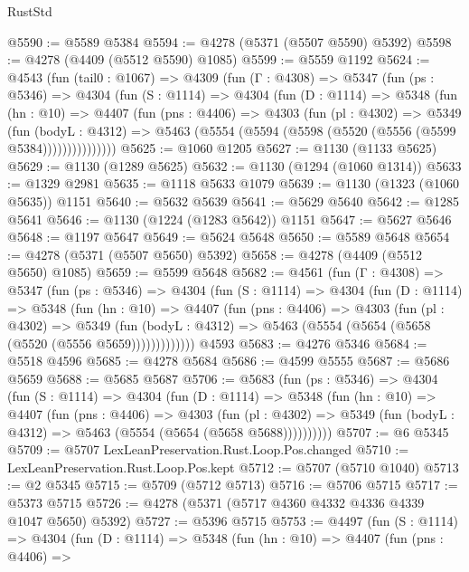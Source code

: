 \begin{lexlean}{RustStd}
\begin{coremodule}
@5590 := @5589 @5384
@5594 := @4278 (@5371 (@5507 @5590) @5392)
@5598 := @4278 (@4409 (@5512 @5590) @1085)
@5599 := @5559 @1192
@5624 := @4543
    (fun (tail0 : @1067) =>
    @4309
      (fun (Γ : @4308) =>
      @5347
        (fun (ps : @5346) =>
        @4304
          (fun (S : @1114) =>
          @4304
            (fun (D : @1114) =>
            @5348
              (fun (hn : @10) =>
              @4407
                (fun (pns : @4406) =>
                @4303
                  (fun (pl : @4302) =>
                  @5349
                    (fun (bodyL : @4312) =>
                    @5463 (@5554 (@5594 (@5598 (@5520 (@5556 (@5599 @5384)))))))))))))))
@5625 := @1060 @1205
@5627 := @1130 (@1133 @5625)
@5629 := @1130 (@1289 @5625)
@5632 := @1130 (@1294 (@1060 @1314))
@5633 := @1329 @2981
@5635 := @1118 @5633 @1079
@5639 := @1130 (@1323 (@1060 @5635)) @1151
@5640 := @5632 @5639
@5641 := @5629 @5640
@5642 := @1285 @5641
@5646 := @1130 (@1224 (@1283 @5642)) @1151
@5647 := @5627 @5646
@5648 := @1197 @5647
@5649 := @5624 @5648
@5650 := @5589 @5648
@5654 := @4278 (@5371 (@5507 @5650) @5392)
@5658 := @4278 (@4409 (@5512 @5650) @1085)
@5659 := @5599 @5648
@5682 := @4561
    (fun (Γ : @4308) =>
    @5347
      (fun (ps : @5346) =>
      @4304
        (fun (S : @1114) =>
        @4304
          (fun (D : @1114) =>
          @5348
            (fun (hn : @10) =>
            @4407
              (fun (pns : @4406) =>
              @4303
                (fun (pl : @4302) =>
                @5349
                  (fun (bodyL : @4312) =>
                  @5463 (@5554 (@5654 (@5658 (@5520 (@5556 @5659)))))))))))))
    @4593
@5683 := @4276 @5346
@5684 := @5518 @4596
@5685 := @4278 @5684
@5686 := @4599 @5555
@5687 := @5686 @5659
@5688 := @5685 @5687
@5706 := @5683
    (fun (ps : @5346) =>
    @4304
      (fun (S : @1114) =>
      @4304
        (fun (D : @1114) =>
        @5348
          (fun (hn : @10) =>
          @4407
            (fun (pns : @4406) =>
            @4303
              (fun (pl : @4302) =>
              @5349 (fun (bodyL : @4312) => @5463 (@5554 (@5654 (@5658 @5688))))))))))
@5707 := @6 @5345
@5709 := @5707 LexLeanPreservation.Rust.Loop.Pos.changed
@5710 := LexLeanPreservation.Rust.Loop.Pos.kept
@5712 := @5707 (@5710 @1040)
@5713 := @2 @5345
@5715 := @5709 (@5712 @5713)
@5716 := @5706 @5715
@5717 := @5373 @5715
@5726 := @4278 (@5371 (@5717 @4360 @4332 @4336 @4339 @1047 @5650) @5392)
@5727 := @5396 @5715
@5753 := @4497
    (fun (S : @1114) =>
    @4304
      (fun (D : @1114) =>
      @5348
        (fun (hn : @10) =>
        @4407
          (fun (pns : @4406) =>

\end{coremodule}
\end{lexlean}
